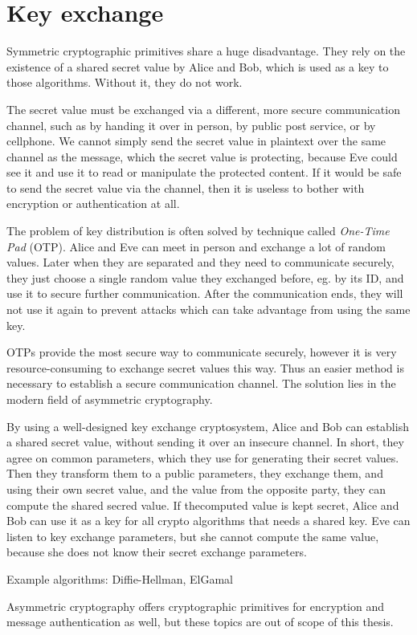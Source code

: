 \section{Key exchange}
\label{toc/key-exchange}

Symmetric cryptographic primitives share a huge disadvantage. They rely on the existence of a shared secret value by Alice and Bob, which is used as a key to those algorithms. Without it, they do not work.

The secret value must be exchanged via a different, more secure communication channel, such as by handing it over in person, by public post service, or by cellphone. We cannot simply send the secret value in plaintext over the same channel as the message, which the secret value is protecting, because Eve could see it and use it to read or manipulate the protected content. If it would be safe to send the secret value via the channel, then it is useless to bother with encryption or authentication at all.

The problem of key distribution is often solved by technique called \textit{One-Time Pad} (OTP). Alice and Eve can meet in person and exchange a lot of random values. Later when they are separated and they need to communicate securely, they just choose a single random value they exchanged before, eg. by its ID, and use it to secure further communication. After the communication ends, they will not use it again to prevent attacks which can take advantage from using the same key.

OTPs provide the most secure way to communicate securely, however it is very resource-consuming to exchange secret values this way. Thus an easier method is necessary to establish a secure communication channel. The solution lies in the modern field of asymmetric cryptography.

By using a well-designed key exchange cryptosystem, Alice and Bob can establish a shared secret value, without sending it over an insecure channel. In short, they agree on common parameters, which they use for generating their secret values. Then they transform them to a public parameters, they exchange them, and using their own secret value, and the value from the opposite party, they can compute the shared secred value. If thecomputed value is kept secret, Alice and Bob can use it as a key for all crypto algorithms that needs a shared key. Eve can listen to key exchange parameters, but she cannot compute the same value, because she does not know their secret exchange parameters.

Example algorithms: Diffie-Hellman, ElGamal

Asymmetric cryptography offers cryptographic primitives for encryption and message authentication as well, but these topics are out of scope of this thesis.
